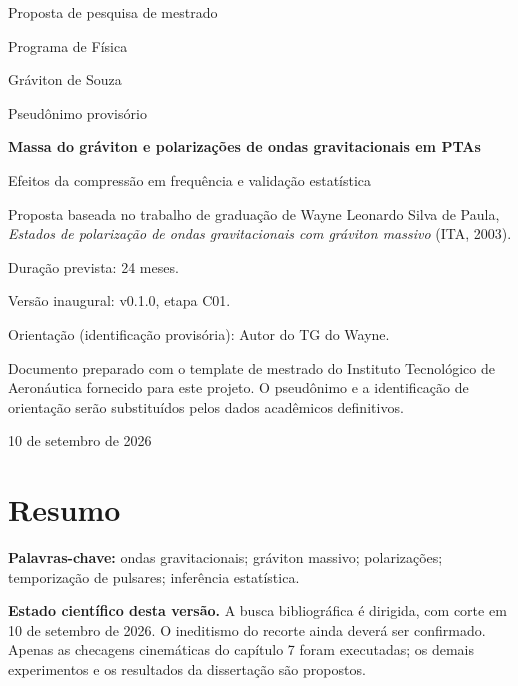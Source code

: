 \documentclass[msc]{ita}
\begin{document}
\hypersetup{pageanchor=false}
\begin{titlepage}
\centering
{\large Proposta de pesquisa de mestrado\par}
\vspace{0.5cm}
{\normalsize Programa de Física\par}
\vspace{0.5cm}
{\large Gráviton de Souza\par}
{\small Pseudônimo provisório\par}
\vspace{2.2cm}
{\LARGE\bfseries Massa do gráviton e polarizações de ondas gravitacionais em PTAs\par}
\vspace{0.8cm}
{\Large Efeitos da compressão em frequência e validação estatística\par}
\vspace{1.8cm}
\begin{minipage}{0.85\textwidth}
\normalsize
Proposta baseada no trabalho de graduação de Wayne Leonardo Silva de Paula,
\textit{Estados de polarização de ondas gravitacionais com gráviton massivo}
(ITA, 2003).\par
\medskip
Duração prevista: 24 meses.\par
Versão inaugural: v0.1.0, etapa C01.\par
\medskip
Orientação (identificação provisória): Autor do TG do Wayne.\par
\medskip
Documento preparado com o template de mestrado do Instituto Tecnológico de
Aeronáutica fornecido para este projeto. O pseudônimo e a identificação de
orientação serão substituídos pelos dados acadêmicos definitivos.
\end{minipage}
\vfill
{\large 10 de setembro de 2026\par}
\end{titlepage}
\frontmatter
\hypersetup{pageanchor=true}
\chapter*{Resumo}

\par\medskip
\noindent\textbf{Palavras-chave:} ondas gravitacionais; gráviton massivo;
polarizações; temporização de pulsares; inferência estatística.
\par\medskip
\noindent\textbf{Estado científico desta versão.} A busca bibliográfica é dirigida,
com corte em 10 de setembro de 2026. O ineditismo do recorte ainda deverá ser
confirmado. Apenas as checagens cinemáticas do capítulo 7 foram executadas;
os demais experimentos e os resultados da dissertação são propostos.
\begingroup
\singlespacing
\setlength{\parskip}{0pt}
\tableofcontents
\endgroup
\mainmatter
{}









\appendix

\printbibliography[heading=bibintoc,title={Referências}]
\end{document}
